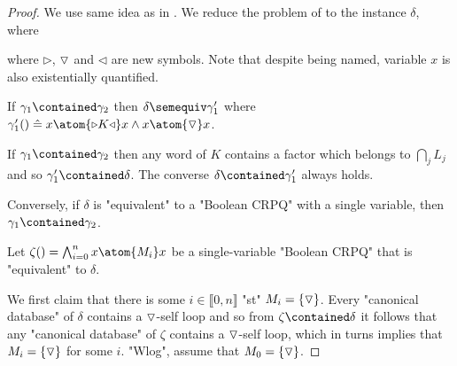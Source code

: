 \begin{proof}
	We use same idea as in .
	We reduce the problem of  to the instance $\delta$, where
	\begin{center}
    \end{center}
	where $\triangleright$, $\triangledown$ and $\triangleleft$ are new symbols.
	Note that despite being named, variable $x$ is also existentially quantified.
	
	\begin{claim}
		\AP\label{claim:variable-minimization-lowerbound-1}
		If $\gamma_1 \contained \gamma_2$ then $\delta \semequiv \gamma'_1$
		where $\gamma'_1() \defeq x \atom{\triangleright K \triangleleft} x
		\land x \atom{\marking} x$.
	\end{claim}
	
	If $\gamma_1 \contained \gamma_2$ then any word of $K$ contains a
	factor which belongs to $\bigcap_j L_j$ and so $\gamma'_1 \contained \delta$.
	The converse $\delta \contained \gamma'_1$ always holds.

	\begin{claim}
		\AP\label{claim:variable-minimization-lowerbound-2}
		Conversely, if $\delta$ is "equivalent" to a "Boolean CRPQ" with
		a single variable, then $\gamma_1 \contained \gamma_2$.
	\end{claim}

	Let $\zeta() = \bigwedge_{i=0}^n x \atom{M_i} x$ be a single-variable "Boolean CRPQ"
	that is "equivalent" to $\delta$.

	We first claim that there is some $i \in \lBrack 0,n\rBrack$
	"st" $M_i = \{\triangledown\}$. Every "canonical database" of $\delta$ contains a $\triangledown$-self loop
	and so from $\zeta \contained \delta$ it follows that any
	"canonical database" of $\zeta$ contains a $\triangledown$-self loop, which in turns implies
	that $M_i = \{\triangledown\}$ for some $i$. "Wlog", assume that $M_0 = \{\triangledown\}$.
	

\end{proof}

